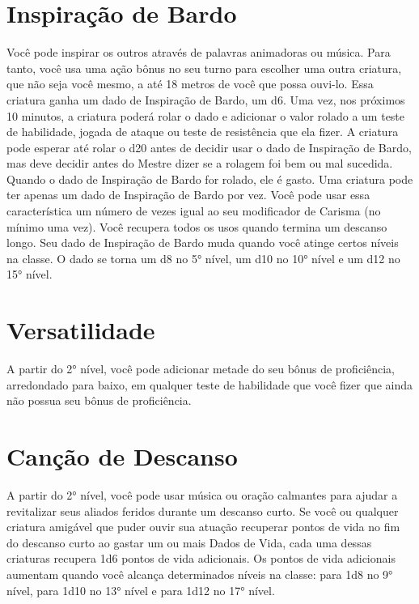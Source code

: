 \documentclass{RPG_Adventure}[2021/10/20]
\begin{document}
\section*{Inspiração de Bardo}

Você pode inspirar os outros através de palavras animadoras ou música. Para
tanto, você usa uma ação bônus no seu turno para escolher uma outra criatura,
que não seja você mesmo, a até 18 metros de você que possa ouvi-lo. Essa
criatura ganha um dado de Inspiração de Bardo, um d6.
Uma vez, nos próximos 10 minutos, a criatura poderá rolar o dado e adicionar o
valor rolado a um teste de habilidade, jogada de ataque ou teste de resistência
que ela fizer. A criatura pode esperar até rolar o d20 antes de decidir usar o
dado de Inspiração de Bardo, mas deve decidir antes do Mestre dizer se a rolagem
foi bem ou mal sucedida. Quando o dado de Inspiração de Bardo for rolado, ele é
gasto. Uma criatura pode ter apenas um dado de Inspiração de Bardo por vez.
Você pode usar essa característica um número de vezes igual ao seu modificador
de Carisma (no mínimo uma vez). Você recupera todos os usos quando termina um
descanso longo.
Seu dado de Inspiração de Bardo muda quando você atinge certos níveis na classe.
O dado se torna um d8 no 5° nível, um d10 no 10° nível e um d12 no 15° nível.

\section*{Versatilidade}%
\label{sec:versatilidade}

A partir do 2° nível, você pode adicionar metade do seu bônus de proficiência,
arredondado para baixo, em qualquer teste de habilidade que você fizer que ainda
não possua seu bônus de proficiência.

\section*{Canção de Descanso}%
\label{sec:cancao_de_descanso}

A partir do 2° nível, você pode usar música ou oração calmantes para ajudar a
revitalizar seus aliados feridos durante um descanso curto. Se você ou qualquer
criatura amigável que puder ouvir sua atuação recuperar pontos de vida no fim do
descanso curto ao gastar um ou mais Dados de Vida, cada uma dessas criaturas
recupera 1d6 pontos de vida adicionais.
Os pontos de vida adicionais aumentam quando você alcança determinados níveis na
classe: para 1d8 no 9° nível, para 1d10 no 13° nível e para 1d12 no 17°
nível.
\end{document}
